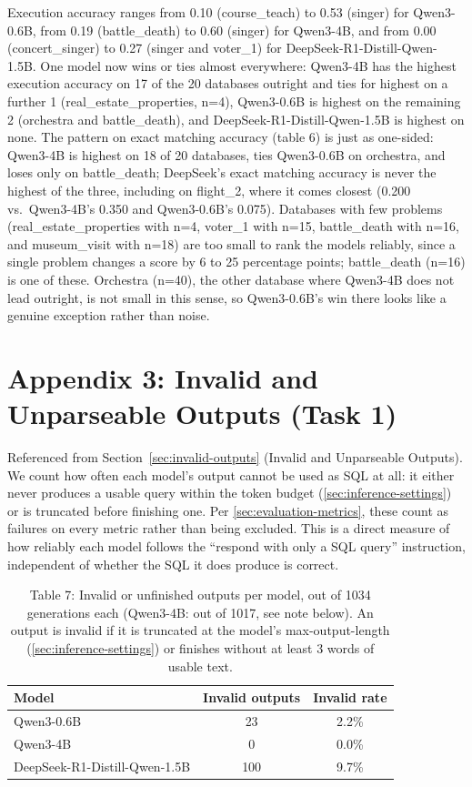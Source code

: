 \documentclass[11pt]{article}
\begin{document}
Execution accuracy ranges from 0.10 (course\_teach) to 0.53 (singer) for Qwen3-0.6B, from 0.19 (battle\_death) to 0.60 (singer) for Qwen3-4B, and from 0.00 (concert\_singer) to 0.27 (singer and voter\_1) for DeepSeek-R1-Distill-Qwen-1.5B. One model now wins or ties almost everywhere: Qwen3-4B has the highest execution accuracy on 17 of the 20 databases outright and ties for highest on a further 1 (real\_estate\_properties, n=4), Qwen3-0.6B is highest on the remaining 2 (orchestra and battle\_death), and DeepSeek-R1-Distill-Qwen-1.5B is highest on none. The pattern on exact matching accuracy (table 6) is just as one-sided: Qwen3-4B is highest on 18 of 20 databases, ties Qwen3-0.6B on orchestra, and loses only on battle\_death; DeepSeek's exact matching accuracy is never the highest of the three, including on flight\_2, where it comes closest (0.200 vs.\ Qwen3-4B's 0.350 and Qwen3-0.6B's 0.075). Databases with few problems (real\_estate\_properties with n=4, voter\_1 with n=15, battle\_death with n=16, and museum\_visit with n=18) are too small to rank the models reliably, since a single problem changes a score by 6 to 25 percentage points; battle\_death (n=16) is one of these. Orchestra (n=40), the other database where Qwen3-4B does not lead outright, is not small in this sense, so Qwen3-0.6B's win there looks like a genuine exception rather than noise.

\section*{Appendix 3: Invalid and Unparseable Outputs (Task 1)}
\label{sec:appendix3}

Referenced from Section~\ref{sec:invalid-outputs} (Invalid and Unparseable Outputs). We count how often each model's output cannot be used as SQL at all: it either never produces a usable query within the token budget (\ref{sec:inference-settings}) or is truncated before finishing one. Per \ref{sec:evaluation-metrics}, these count as failures on every metric rather than being excluded. This is a direct measure of how reliably each model follows the ``respond with only a SQL query'' instruction, independent of whether the SQL it does produce is correct.

\begin{table}[H]
\centering
\footnotesize
\caption{Table 7: Invalid or unfinished outputs per model, out of 1034 generations each (Qwen3-4B: out of 1017, see note below). An output is invalid if it is truncated at the model's max-output-length (\ref{sec:inference-settings}) or finishes without at least 3 words of usable text.}
\label{tab:invalid-outputs}
\begin{tabular}{lcc}
\toprule
Model & Invalid outputs & Invalid rate \\
\midrule
Qwen3-0.6B & 23 & 2.2\% \\
Qwen3-4B & 0 & 0.0\% \\
DeepSeek-R1-Distill-Qwen-1.5B & 100 & 9.7\% \\
\bottomrule
\end{tabular}
\end{table}
\end{document}
